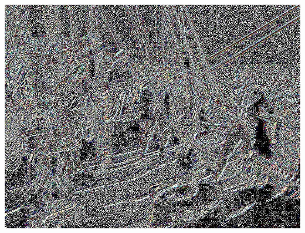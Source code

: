 \documentclass[a4paper,12pt]{article}
\begin{document}
\begin{center}
\includegraphics[width=0.8\linewidth,height=0.7\textheight]{Preconditioning/test_PAETH}
\end{center}
\newpage
\end{document}
